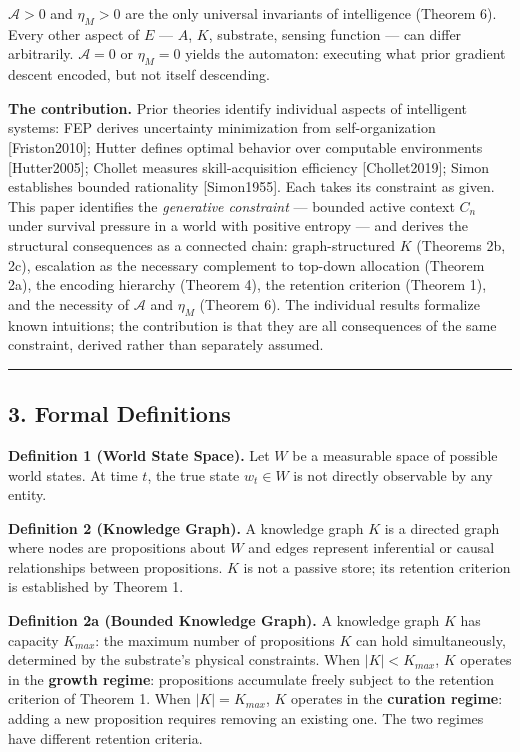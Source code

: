 \documentclass[
]{article}
\begin{document}
\(\mathcal{A} > 0\) and \(\eta_M > 0\) are the only universal invariants
of intelligence (Theorem 6). Every other aspect of \(E\) --- \(A\),
\(K\), substrate, sensing function --- can differ arbitrarily.
\(\mathcal{A} = 0\) or \(\eta_M = 0\) yields the automaton: executing
what prior gradient descent encoded, but not itself descending.

\textbf{The contribution.} Prior theories identify individual aspects of
intelligent systems: FEP derives uncertainty minimization from
self-organization {[}Friston2010{]}; Hutter defines optimal behavior
over computable environments {[}Hutter2005{]}; Chollet measures
skill-acquisition efficiency {[}Chollet2019{]}; Simon establishes
bounded rationality {[}Simon1955{]}. Each takes its constraint as
given. This paper identifies the \emph{generative constraint} --- bounded
active context \(C_n\) under survival pressure in a world with positive
entropy --- and derives the structural consequences as a connected chain:
graph-structured \(K\) (Theorems 2b, 2c), escalation as the necessary
complement to top-down allocation (Theorem 2a), the encoding hierarchy (Theorem 4),
the retention criterion (Theorem 1), and the necessity of
\(\mathcal{A}\) and \(\eta_M\) (Theorem 6). The individual results
formalize known intuitions; the contribution is that they are all
consequences of the same constraint, derived rather than separately
assumed.

\begin{center}\rule{0.5\linewidth}{0.5pt}\end{center}

\subsection{3. Formal Definitions}\label{formal-definitions}

\textbf{Definition 1 (World State Space).} Let \(W\) be a measurable
space of possible world states. At time \(t\), the true state
\(w_t \in W\) is not directly observable by any entity.

\textbf{Definition 2 (Knowledge Graph).} A knowledge graph \(K\) is a
directed graph where nodes are propositions about \(W\) and edges
represent inferential or causal relationships between propositions.
\(K\) is not a passive store; its retention criterion is established by
Theorem 1.

\textbf{Definition 2a (Bounded Knowledge Graph).} A knowledge graph
\(K\) has capacity \(K_{max}\): the maximum number of propositions \(K\)
can hold simultaneously, determined by the substrate's physical
constraints. When \(|K| < K_{max}\), \(K\) operates in the
\textbf{growth regime}: propositions accumulate freely subject to the
retention criterion of Theorem 1. When \(|K| = K_{max}\), \(K\) operates
in the \textbf{curation regime}: adding a new proposition requires
removing an existing one. The two regimes have different retention
criteria.
\end{document}
